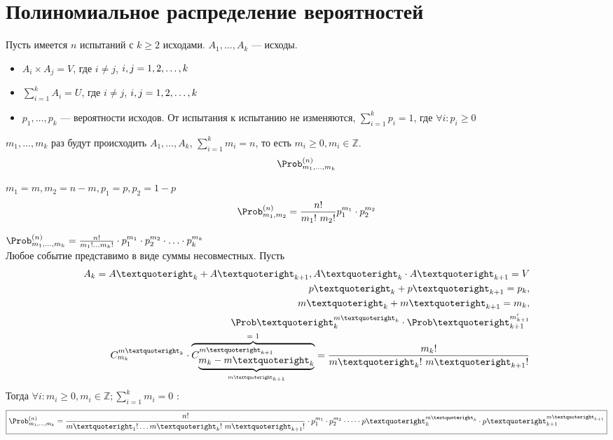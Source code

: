 \section{Полиномиальное распределение вероятностей}
Пусть имеется $n$ испытаний с $k \geqslant 2$ исходами. $A_1, \dots, A_k$ --- исходы.
\begin{itemize}
	\item $A_i \times A_j = V$, где $i \not = j$, $i, j = 1,2,\dots,k$
	\item $\sum\limits_{i=1}^k A_i = U$, где $i \not = j$, $i, j = 1,2,\dots,k$
	\item $p_1, \dots, p_k$ --- вероятности исходов. От испытания к испытанию не изменяются, $\sum\limits_{i=1}^k p_i = 1$, где $\forall i: p_i \geq 0$
\end{itemize}
$m_1, \dots, m_k$ раз будут происходить $A_1, \dots, A_k$, $\sum\limits_{i=1}^k m_i = n$, то есть $m_i \geq 0, m_i \in \mathbb{Z}$. \\
\[ \Prob_{m_1, \dots, m_k}^{(n)} \]
\begin{description}[leftmargin=0cm]
	\item[$k = 2, \Prob_{m_1, m_2}^{(n)}:$] $m_1 = m, m_2 = n-m, p_1 = p, p_2 = 1-p$
	      \[
		      \Prob_{m_1, m_2}^{(n)} = \frac{n!}{m_1 !\ m_2 !} p_1^{m_1} \cdot p_2^{m_2}
	      \]
	\item[$k \ge 2:$] $\Prob_{m_1, \ldots, m_k}^{(n)} = \frac{n!}{m_1 ! \ldots m_k !} \cdot p_1^{m_1} \cdot p_2^{m_2} \cdot \ldots \cdot p_k^{m_k}$ \\
	      Любое событие представимо в виде суммы несовместных. Пусть
	      \[
		      \begin{split}
			      A_k = A’_k + A’_{k+1}, A’_k \cdot A’_{k+1} = V \\
			      p’_k + p’_{k+1} = p_k, \\
			      m’_k + m’_{k+1} = m_k, \\
			      {\Prob’}_{k}^{m’_{k}} \cdot {\Prob’}_{k+1}^{m'_{k+1}} \\
			      C_{m_k}^{{m’}_k} \cdot \overbrace{ C_{\underbrace{{m_k - {m’}_k}}_{{m’}_{k+1}}}^{{m’}_{k+1}} }^{\text{= 1}} = \frac{m_k !}{{m’}_k !\ {m’}_{k+1} !}
		      \end{split}
	      \]
	      Тогда $ \forall i : m_i \geqslant 0, m_i \in \mathbb{Z};  \sum\limits_{i=1}^k m_i = 0$ :
	      \[
		      \boxed{\Prob_{m_1, \dots, m_k}^{(n)} = \frac{n!}{{m’}_1 ! \ldots {m’}_k !\ {m’}_{k+1} !} \cdot p_1^{m_1} \cdot p_2^{m_2} \cdot \dots \cdot {p’}_k^{{m’}_k} \cdot {p’}_{k+1}^{{m’}_{k+1}}}
	      \]
\end{description}


